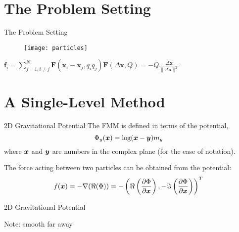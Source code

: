 \section{The Problem Setting}

\begin{frame}{The Problem Setting}
  \begin{figure}[htp]
      \texttt{[image: particles]}
      \label{fig:particles}
  \end{figure}
  \vspace{9mm}
  $\boldsymbol{f}_{i}=\sum_{j=1, i \neq j}^{N} \boldsymbol{F}\left(\boldsymbol{x}_{i}-\boldsymbol{x}_{j}, q_{i} q_{j}\right)$\hspace{5cm}$\boldsymbol{F}(\Delta \boldsymbol{x}, Q)=-Q \frac{\Delta \boldsymbol{x}}{\|\Delta \boldsymbol{x}\|^{2}}$
\end{frame}

\section{A Single-Level Method}

\begin{frame}{2D Gravitational Potential}
  The FMM is defined in terms of the potential,
  \begin{equation}
    \Phi_y(\boldsymbol{x}) = \log(\boldsymbol{x} - \boldsymbol{y}) m_y
  \end{equation}
  where $\boldsymbol{x}$ and $\boldsymbol{y}$ are numbers in the complex plane (for the ease of notation).

  The force acting between two particles can be obtained from the potential:
  \begin{equation}
    f(\boldsymbol{x}) = -\nabla(\Re(\Phi)) = -\left(\Re\left(\frac{\partial  \Phi}{\partial \boldsymbol{x} }\right), -\Im\left(\frac{\partial  \Phi}{\partial \boldsymbol{x} }\right)\right)^T
  \end{equation}
\end{frame}

\begin{frame}{2D Gravitational Potential}
  \vfill
  \begin{figure}
    \centering
  \end{figure}
  Note: smooth far away
\end{frame}


